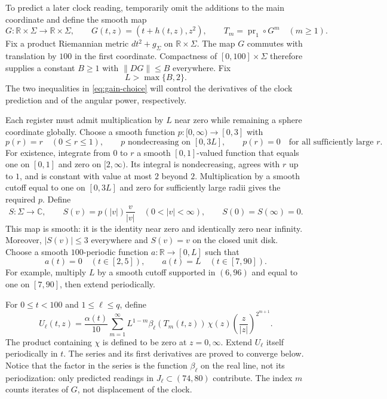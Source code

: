 To predict a later clock reading, temporarily omit the additions to the
main coordinate and define the smooth map
\begin{equation}
\label{eq:prediction-map}
 G\colon\mathbb R\times\Sigma\longrightarrow\mathbb R\times\Sigma,
 \qquad G(t,z)=(t+h(t,z),z^2),
 \qquad T_m=\operatorname{pr}_1\circ G^m\quad(m\ge1).
\end{equation}
Fix a product Riemannian metric $dt^2+g_\Sigma$ on $\mathbb R\times\Sigma$.
The map $G$ commutes with translation by $100$ in the first coordinate.
Compactness of $[0,100]\times\Sigma$ therefore supplies a constant
$B\ge1$ with $\|DG\|\le B$ everywhere.  Fix
\begin{equation}
\label{eq:gain-choice}
 L>\max\{B,2\}.
\end{equation}
The two inequalities in \eqref{eq:gain-choice} will control the derivatives
of the clock prediction and of the angular power, respectively.

Each register must admit multiplication by $L$ near zero while remaining
a sphere coordinate globally.  Choose a smooth function
$p\colon[0,\infty)\to[0,3]$ with
\[
 p(r)=r\quad(0\le r\le1),\qquad
 p\text{ nondecreasing on }[0,3L],\qquad
 p(r)=0\quad\text{for all sufficiently large }r.
\]
For existence, integrate from $0$ to $r$ a smooth $[0,1]$-valued function
that equals one on $[0,1]$ and zero on $[2,\infty)$.  Its integral is nondecreasing,
agrees with $r$ up to $1$, and is constant with value at most $2$ beyond
$2$.  Multiplication by a smooth cutoff equal to one on $[0,3L]$ and
zero for sufficiently large radii gives the required $p$.  Define
\begin{equation}
\label{eq:register-saturation}
 S\colon\Sigma\longrightarrow\mathbb C,
 \qquad
 S(v)=p(|v|)\frac{v}{|v|}\quad(0<|v|<\infty),
 \qquad S(0)=S(\infty)=0.
\end{equation}
This map is smooth: it is the identity near zero and identically zero
near infinity.  Moreover, $|S(v)|\le3$ everywhere and $S(v)=v$ on the
closed unit disk.  Choose a smooth $100$-periodic function
$a\colon\mathbb R\to[0,L]$ such that
\begin{equation}
\label{eq:register-gain}
 a(t)=0\quad(t\in[2,5]),\qquad
 a(t)=L\quad(t\in[7,90]).
\end{equation}
For example, multiply $L$ by a smooth cutoff supported in $(6,96)$ and
equal to one on $[7,90]$, then extend periodically.

For $0\le t<100$ and $1\le \ell\le q$, define
\begin{equation}
\label{eq:input}
 U_\ell(t,z)=\frac{\alpha(t)}{10}
 \sum_{m=1}^{\infty} L^{1-m}\beta_\ell(T_m(t,z))\,
 \chi(z)\left(\frac{z}{|z|}\right)^{2^{m+1}}.
\end{equation}
The product containing $\chi$ is defined to be zero at $z=0,\infty$.
Extend $U_\ell$ itself periodically in $t$.  The series and its first
derivatives are proved to converge below.  Notice that the factor in the
series is the function $\beta_\ell$ on the real line, not its periodization:
only predicted readings in $J_\ell\subset(74,80)$ contribute.
The index $m$ counts iterates of $G$, not displacement of the clock.

